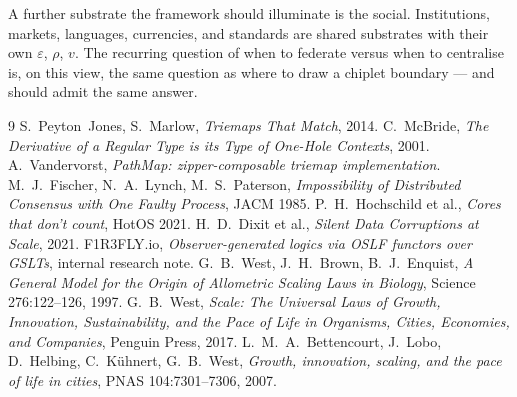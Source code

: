 \documentclass[11pt]{article}
\begin{document}
A further substrate the framework should illuminate is the social. Institutions, markets, languages, currencies, and standards are shared substrates with their own $\varepsilon$, $\rho$, $v$. The recurring question of when to federate versus when to centralise is, on this view, the same question as where to draw a chiplet boundary --- and should admit the same answer.

\begin{thebibliography}{9}
 S.~Peyton~Jones, S.~Marlow, \emph{Triemaps That Match}, 2014.
 C.~McBride, \emph{The Derivative of a Regular Type is its Type of One-Hole Contexts}, 2001.
 A.~Vandervorst, \emph{PathMap: zipper-composable triemap implementation}.
 M.~J.~Fischer, N.~A.~Lynch, M.~S.~Paterson, \emph{Impossibility of Distributed Consensus with One Faulty Process}, JACM 1985.
 P.~H.~Hochschild et al., \emph{Cores that don't count}, HotOS 2021.
 H.~D.~Dixit et al., \emph{Silent Data Corruptions at Scale}, 2021.
 F1R3FLY.io, \emph{Observer-generated logics via OSLF functors over GSLTs}, internal research note.
 G.~B.~West, J.~H.~Brown, B.~J.~Enquist, \emph{A General Model for the Origin of Allometric Scaling Laws in Biology}, Science 276:122--126, 1997.
 G.~B.~West, \emph{Scale: The Universal Laws of Growth, Innovation, Sustainability, and the Pace of Life in Organisms, Cities, Economies, and Companies}, Penguin Press, 2017.
 L.~M.~A.~Bettencourt, J.~Lobo, D.~Helbing, C.~K\"uhnert, G.~B.~West, \emph{Growth, innovation, scaling, and the pace of life in cities}, PNAS 104:7301--7306, 2007.
\end{thebibliography}
\end{document}
